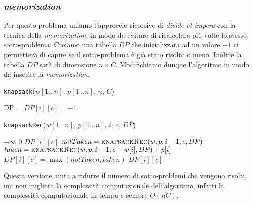             \subsubsection{\textit{memorization}}
                Per questo problema uniamo l'approccio ricorsivo di \textit{divide-et-impera} con la tecnica della \textit{memorization}, in modo da evitare di ricalcolare più volte lo stesso sotto-problema.\newline
                Creiamo una tabella $DP$ che inizializzata ad un valore $-1$ ci permetterà di capire se il sotto-problema è già stato risolto o meno. Inoltre la tabella $DP$ sarà di dimensione $n\times C$. Modifichiamo dunque l'algoritmo in modo da inserire la \textit{memorization}.
                \begin{algorithm}
                    \caption{\Int \texttt{knapsack}(\Int[] $w[1 \ldots n]$, \Int[] $p[1 \ldots n]$, \Int $n$, \Int $C$)}
                    \begin{algorithmic}
                        \State DP = \New \Int[0\dots n][0\dots C]
                                \State $DP[i][c]=-1$
                            \EndFor
                        \EndFor
                        \State \Return {}
                    \end{algorithmic}
                \end{algorithm}
                \begin{algorithm}
                    \caption{\Int \texttt{knapsackRec}(\Int[] $w[1 \ldots n]$, \Int[] $p[1 \ldots n]$, \Int $i$, \Int $c$, \Int[][] $DP$)}
                    \begin{algorithmic}
                            \State \Return $-\infty$
                            \State \Return $0$
                            \State \Return $DP[i][c]$
                        \Else
                            \State $notTaken = \Call{knapsackRec}{w, p, i-1, c, DP}$
                            \State $taken = \Call{knapsackRec}{w, p, i-1, c-w[i], DP}+p[i]$
                            \State $DP[i][c]=\max(notTaken, taken)$
                            \State \Return $DP[i][c]$
                        \EndIf
                    \end{algorithmic}
                \end{algorithm}
                Questa versione aiuta a ridurre il numero di sotto-problemi che vengono risolti, ma non migliora la complessità computazionale dell'algoritmo, infatti la complessità computazionale in tempo è sempre $O(nC)$.
